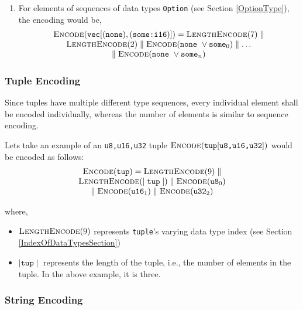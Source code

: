 \documentclass[../alan-handbook.tex]{subfiles}
\begin{document}
\begin{enumerate}
\begin{itemize}
            \end{itemize}
        \item For elements of sequences of data types \texttt{Option} (see Section \ref{OptionType}), the encoding would be,
            $$
            \begin{matrix}
                \Call{Encode}{\texttt{vec}[(\texttt{none}),(\texttt{some:i16})]} = \Call{LengthEncode}{7} \parallel \\ 
                \Call{LengthEncode}{2} \parallel \Call{Encode}{{\texttt{none} \ \vee \texttt{some}}_0} \parallel \ldots \\ 
                \parallel \Call{Encode}{{\texttt{none} \ \vee \texttt{some}}_n}
            \end{matrix}
            $$
\end{enumerate}

\subsubsection{Tuple Encoding} \label{Eg:TupleEncoding}

Since tuples have multiple different type sequences, every individual element shall be encoded individually, whereas the number of elements is similar to sequence encoding.

Lets take an example of an \texttt{u8,u16,u32} tuple $\Call{Encode}{\texttt{tup}[\texttt{u8,u16,u32}]}$ would be encoded as follows:
$$
\begin{matrix}
    \Call{Encode}{\texttt{tup}} = \Call{LengthEncode}{9} \parallel \\ 
    \Call{LengthEncode}{\mid \texttt{tup} \mid}  \parallel \Call{Encode}{\texttt{u8}_0} \\
    \parallel \Call{Encode}{\texttt{u16}_1} \parallel \Call{Encode}{\texttt{u32}_2}
\end{matrix}
$$

where,
\begin{itemize}
    \item $\Call{LengthEncode}{9}$ represents \texttt{tuple}'s varying data type index (see Section \ref{IndexOfDataTypesSection})
    \item $\mid \texttt{tup} \mid$ represents the length of the tuple, i.e., the number of elements in the tuple. In the above example, it is three.
\end{itemize}

\subsubsection{String Encoding} \label{Eg:StringEncoding}
\end{document}

